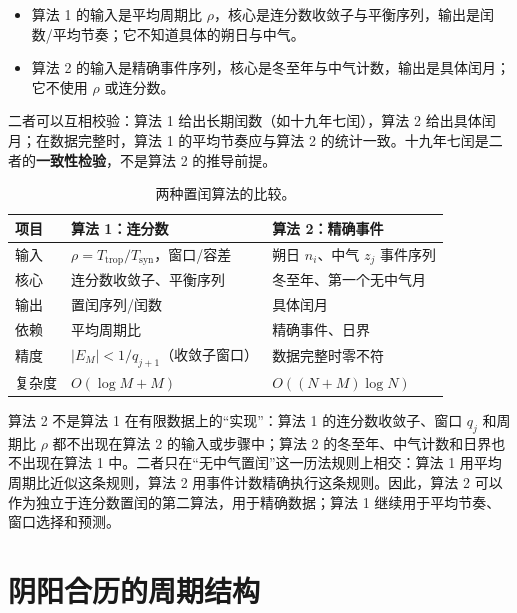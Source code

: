 \begin{itemize}
    \item 算法 1 的输入是平均周期比 \(\rho\)，核心是连分数收敛子与平衡序列，输出是闰数/平均节奏；它不知道具体的朔日与中气。
    \item 算法 2 的输入是精确事件序列，核心是冬至年与中气计数，输出是具体闰月；它不使用 \(\rho\) 或连分数。
\end{itemize}

二者可以互相校验：算法 1 给出长期闰数（如十九年七闰），算法 2 给出具体闰月；在数据完整时，算法 1 的平均节奏应与算法 2 的统计一致。十九年七闰是二者的\textbf{一致性检验}，不是算法 2 的推导前提。

\begin{table}[htbp]
\centering
\small
\caption{两种置闰算法的比较。}
\label{tab:two_intercalation_algorithms}
\begin{tabular}{@{}>{\raggedright\arraybackslash}p{2.8cm}>{\raggedright\arraybackslash}p{4.8cm}>{\raggedright\arraybackslash}p{4.8cm}@{}}
\toprule
项目 & 算法 1：连分数 & 算法 2：精确事件 \\
\midrule
输入 & \(\rho=T_{\text{trop}}/T_{\text{syn}}\)，窗口/容差 & 朔日 \(n_i\)、中气 \(z_j\) 事件序列 \\
核心 & 连分数收敛子、平衡序列 & 冬至年、第一个无中气月 \\
输出 & 置闰序列/闰数 & 具体闰月 \\
依赖 & 平均周期比 & 精确事件、日界 \\
精度 & \(|E_M|<1/q_{j+1}\)（收敛子窗口） & 数据完整时零不符 \\
复杂度 & \(O(\log M+M)\) & \(O((N+M)\log N)\) \\
\bottomrule
\end{tabular}
\end{table}

\begin{remark}[独立性]
\label{rem:two_algorithms_independent}
算法 2 不是算法 1 在有限数据上的“实现”：算法 1 的连分数收敛子、窗口 \(q_j\) 和周期比 \(\rho\) 都不出现在算法 2 的输入或步骤中；算法 2 的冬至年、中气计数和日界也不出现在算法 1 中。二者只在“无中气置闰”这一历法规则上相交：算法 1 用平均周期比近似这条规则，算法 2 用事件计数精确执行这条规则。因此，算法 2 可以作为独立于连分数置闰的第二算法，用于精确数据；算法 1 继续用于平均节奏、窗口选择和预测。
\end{remark}

\section{阴阳合历的周期结构}
\label{sec:lunisolar_structure}

